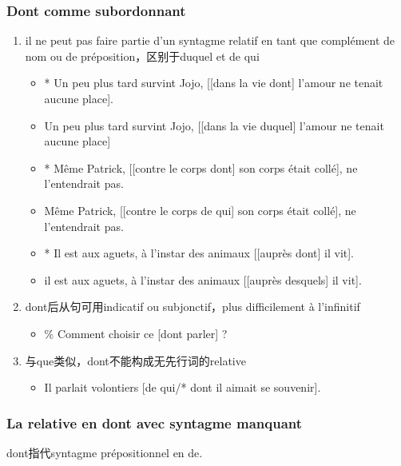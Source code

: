 \documentclass[UTF8]{report}
\begin{document}
\subsubsection{Dont comme subordonnant}
\begin{enumerate}
    \item  il ne peut pas faire partie d’un syntagme relatif en tant que complément de nom ou de préposition，区别于duquel et de qui
    \begin{itemize}
        \item * Un peu plus tard survint Jojo, [[dans la vie dont] l’amour ne tenait aucune place].
        \item Un peu plus tard survint Jojo, [[dans la vie duquel] l’amour ne tenait aucune place]
        \item * Même Patrick, [[contre le corps dont] son corps était collé], ne l’entendrait pas.
        \item Même Patrick, [[contre le corps de qui] son corps était collé], ne l’entendrait pas.
        \item * Il est aux aguets, à l’instar des animaux [[auprès dont] il vit].
        \item il est aux aguets, à l’instar des animaux [[auprès desquels] il vit]. 
    \end{itemize}
    \item dont后从句可用indicatif ou subjonctif，plus difficilement à l’infinitif
    \begin{itemize}
        \item \% Comment choisir ce [dont parler] ?
    \end{itemize}
    \item 与que类似，dont不能构成无先行词的relative
    \begin{itemize}
        \item Il parlait volontiers [de qui/* dont il aimait se souvenir].
    \end{itemize}
\end{enumerate}

\subsubsection{La relative en dont avec syntagme manquant}
dont指代syntagme prépositionnel en de.
\end{document}
